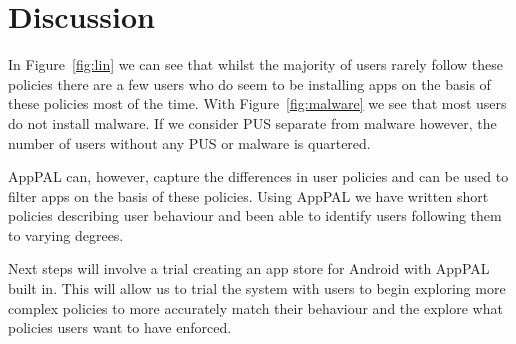 \documentclass[twocolumn,letterpaper]{soups-poster}
\begin{document}
\section{Discussion}

In Figure~\ref{fig:lin} we can see that whilst the majority of users rarely
follow these policies there are a few users who do seem to be installing apps on
the basis of these policies most of the time.
With Figure~\ref{fig:malware} we see that most users do not install malware.
If we consider PUS separate from malware however, the number of users without
any PUS or malware is quartered.

AppPAL can, however, capture the differences in user policies and can be used to
filter apps on the basis of these policies.  Using AppPAL we have written
short policies describing user behaviour and been able to identify users
following them to varying degrees.

Next steps will involve a trial creating an app store for Android with AppPAL
built in.  This will allow us to trial the system with users
to begin exploring more complex policies to more accurately match their
behaviour and the explore what policies users want to have enforced.



\end{document}
